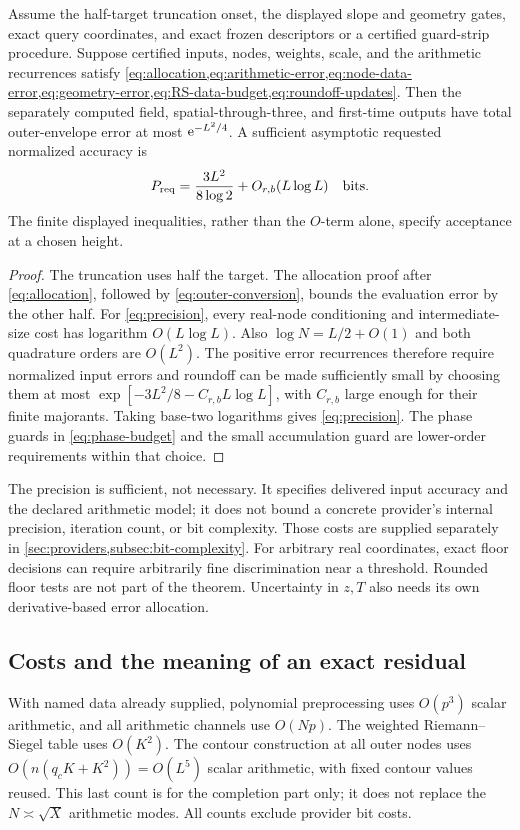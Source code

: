 \begin{theorem}
\label{thm:evaluation}
Assume the half-target truncation onset, the displayed slope and
geometry gates, exact query coordinates, and exact frozen
descriptors or a certified guard-strip procedure. Suppose
certified inputs, nodes, weights, scale, and the arithmetic
recurrences satisfy
\cref{eq:allocation,eq:arithmetic-error,eq:node-data-error,eq:geometry-error,eq:RS-data-budget,eq:roundoff-updates}.
Then the separately computed field, spatial-through-three, and
first-time outputs have total outer-envelope error at most
\(\mathrm e^{-L^2/4}\).
A sufficient asymptotic requested normalized accuracy is
\begin{equation}
 P_{\mathrm{req}}=
             \frac{3L^2}{8\log2}+O_{r,b}(L\log L)
 \quad\hbox{bits}.
 \label{eq:precision}
\end{equation}
The finite displayed inequalities, rather than the \(O\)-term
alone, specify acceptance at a chosen height.
\end{theorem}
\begin{proof}
The truncation uses half the target.
The allocation proof after \eqref{eq:allocation}, followed by
\eqref{eq:outer-conversion}, bounds the evaluation error by
the other half.
For \eqref{eq:precision}, every real-node conditioning and
intermediate-size cost has logarithm \(O(L\log L)\).
Also \(\log N=L/2+O(1)\) and both quadrature orders are
\(O(L^2)\). The positive error recurrences therefore require
normalized input errors and roundoff can be made sufficiently
small by choosing them at most
\(\exp[-3L^2/8-C_{r,b}L\log L]\), with \(C_{r,b}\)
large enough for their finite majorants.
Taking base-two logarithms gives \eqref{eq:precision}.
The phase guards in \eqref{eq:phase-budget} and the small
accumulation guard are lower-order requirements within that
choice.
\end{proof}
The precision is sufficient, not necessary. It specifies
delivered input accuracy and the declared arithmetic model;
it does not bound a concrete provider's internal precision,
iteration count, or bit complexity. Those costs are supplied separately
in \cref{sec:providers,subsec:bit-complexity}.
For arbitrary real coordinates, exact floor decisions can require
arbitrarily fine discrimination near a threshold. Rounded
floor tests are not part of the theorem. Uncertainty in \(z,T\)
also needs its own derivative-based error allocation.

\subsection{Costs and the meaning of an exact residual}
With named data already supplied, polynomial preprocessing uses
\(O(p^3)\) scalar arithmetic, and all arithmetic channels use
\(O(Np)\). The weighted Riemann--Siegel table uses \(O(K^2)\).
The contour construction at all outer nodes uses
\(O(n(q_cK+K^2))=O(L^5)\) scalar arithmetic, with fixed contour
values reused. This last count is for the completion part only;
it does not replace the \(N\asymp\sqrt X\) arithmetic modes.
All counts exclude provider bit costs.

